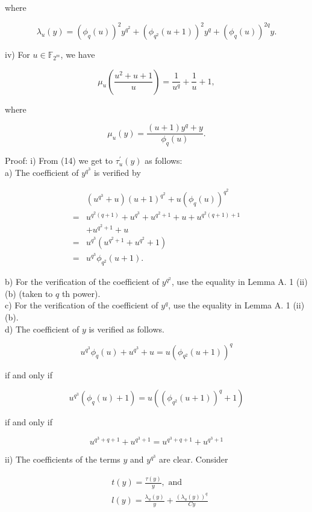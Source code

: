 \documentclass[10pt]{article}
\begin{document}
where

$$
\lambda_{u}(y)=\left(\phi_{q}(u)\right)^{2} y^{q^{2}}+\left(\phi_{q^{2}}(u+1)\right)^{2} y^{q}+\left(\phi_{q}(u)\right)^{2 q} y .
$$

iv) For $u \in \mathbb{F}_{2^{m}}$, we have

$$
\mu_{u}\left(\frac{u^{2}+u+1}{u}\right)=\frac{1}{u^{q}}+\frac{1}{u}+1,
$$

where

$$
\mu_{u}(y)=\frac{(u+1) y^{q}+y}{\phi_{q}(u)} .
$$

Proof: i) From (14) we get to $\tau_{u}^{\prime}(y)$ as follows:\\
a) The coefficient of $y^{q^{3}}$ is verified by

$$
\begin{aligned}
& \left(u^{q^{3}}+u\right)(u+1)^{q^{2}}+u\left(\phi_{q}(u)\right)^{q^{2}} \\
= & u^{q^{2}(q+1)}+u^{q^{3}}+u^{q^{2}+1}+u+u^{q^{2}(q+1)+1} \\
& +u^{q^{2}+1}+u \\
= & u^{q^{3}}\left(u^{q^{2}+1}+u^{q^{2}}+1\right) \\
= & u^{q^{3}} \phi_{q^{2}}(u+1) .
\end{aligned}
$$

b) For the verification of the coefficient of $y^{q^{2}}$, use the equality in Lemma A. 1 (ii) (b) (taken to $q$ th power).\\
c) For the verification of the coefficient of $y^{q}$, use the equality in Lemma A. 1 (ii) (b).\\
d) The coefficient of $y$ is verified as follows.

$$
u^{q^{3}} \phi_{q}(u)+u^{q^{3}}+u=u\left(\phi_{q^{2}}(u+1)\right)^{q}
$$

if and only if

$$
u^{q^{3}}\left(\phi_{q}(u)+1\right)=u\left(\left(\phi_{q^{2}}(u+1)\right)^{q}+1\right)
$$

if and only if

$$
u^{q^{3}+q+1}+u^{q^{3}+1}=u^{q^{3}+q+1}+u^{q^{3}+1}
$$

ii) The coefficients of the terms $y$ and $y^{q^{3}}$ are clear. Consider

$$
\begin{aligned}
& t(y)=\frac{\tau(y)}{y}, \text { and } \\
& l(y)=\frac{\lambda_{u}(y)}{y}+\frac{\left(\lambda_{u}(y)\right)^{q}}{C y}
\end{aligned}
$$
\end{document}
